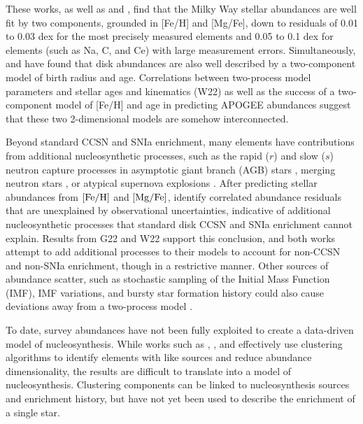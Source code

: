 \documentclass[modern]{aastex631}
\newcommand{\mgfe}[0]{[{\rm Mg/Fe}]}
\newcommand{\feh}[0]{[{\rm Fe/H}]}
\begin{document}
These works, as well as \citet{ting2022} and \citet{ratcliffe2023}, find that the Milky Way stellar abundances are well fit by two components, grounded in [Fe/H] and [Mg/Fe], down to residuals of 0.01 to 0.03 dex for the most precisely measured elements and 0.05 to 0.1 dex for elements (such as Na, C, and Ce) with large measurement errors. Simultaneously, \citet{frankel2018} and \citet{ness2022} have found that disk abundances are also well described by a two-component model of birth radius and age. Correlations between two-process model parameters and stellar ages and kinematics (W22) as well as the success of a two-component model of [Fe/H] and age in predicting APOGEE abundances \citep{ness2019} suggest that these two 2-dimensional models are somehow interconnected. 

Beyond standard CCSN and SNIa enrichment, many elements have contributions from additional nucleosynthetic processes, such as the rapid ($r$) and slow ($s$) neutron capture processes \citep[e.g.,][]{arlandini1999, bisterzo2014} in asymptotic giant branch (AGB) stars \citep[e.g.,][]{simmerer2004, karakas2016}, merging neutron stars \citep[e.g.,][]{kilpatrick2017}, or atypical supernova explosions \citep[e.g.,][]{nomoto2013}. After predicting stellar abundances from $\feh$ and $\mgfe$, \citet{ting2022} identify correlated abundance residuals that are unexplained by observational uncertainties, indicative of additional nucleosynthetic processes that standard disk CCSN and SNIa enrichment cannot explain. Results from G22 and W22 support this conclusion, and both works attempt to add additional processes to their models to account for non-CCSN and non-SNIa enrichment, though in a restrictive manner. Other sources of abundance scatter, such as stochastic sampling of the Initial Mass Function (IMF), IMF variations, and bursty star formation history could also cause deviations away from a two-process model \citep{belokurov2018, griffith2023}.

To date, survey abundances have not been fully exploited to create a data-driven model of nucleosynthesis. While works such as \citet{ting2012}, \citet{casey2019}, and \citet{ratcliffe2020} effectively use clustering algorithms to identify elements with like sources and reduce abundance dimensionality, the results are difficult to translate into a model of nucleosynthesis. Clustering components can be linked to nucleosynthesis sources and enrichment history, but have not yet been used to describe the enrichment of a single star.
\end{document}

